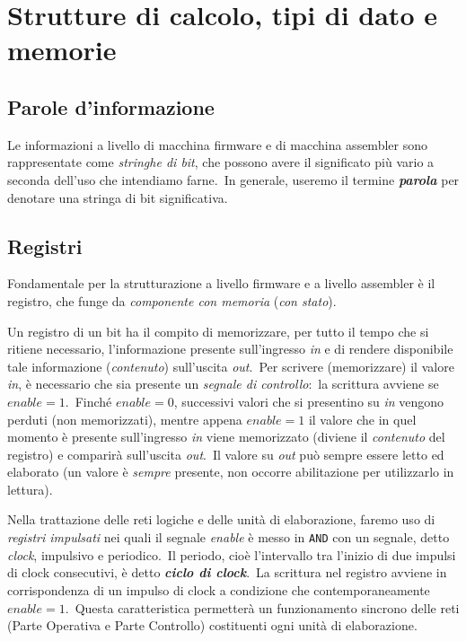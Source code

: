 \section{Strutture di calcolo, tipi di dato e memorie}

\subsection{Parole d'informazione}

Le informazioni a livello di macchina firmware e di macchina assembler sono rappresentate come \textit{stringhe di bit}, che possono avere il significato più vario a seconda dell'uso che intendiamo farne.\
In generale, useremo il termine \textbf{\textit{parola}} per denotare una stringa di bit significativa.

\subsection{Registri}

Fondamentale per la strutturazione a livello firmware e a livello assembler è il registro, che funge da \textit{componente con memoria} (\textit{con stato}).\

Un registro di un bit ha il compito di memorizzare, per tutto il tempo che si ritiene necessario, l'informazione presente sull'ingresso \textit{in} e di rendere disponibile tale informazione (\textit{contenuto}) sull'uscita \textit{out}.\
Per scrivere (memorizzare) il valore \textit{in}, è necessario che sia presente un \textit{segnale di controllo}:\ la scrittura avviene se $\mathit{enable} = 1$.\
Finché $\mathit{enable} = 0$, successivi valori che si presentino su \textit{in} vengono perduti (non memorizzati), mentre appena $\mathit{enable} = 1$ il valore che in quel momento è presente sull'ingresso \textit{in} viene memorizzato (diviene il \textit{contenuto} del registro) e comparirà sull'uscita \textit{out}.\
Il valore su \textit{out} può sempre essere letto ed elaborato (un valore è \textit{sempre} presente, non occorre abilitazione per utilizzarlo in lettura).

Nella trattazione delle reti logiche e delle unità di elaborazione, faremo uso di \textit{registri impulsati} nei quali il segnale \textit{enable} è messo in \texttt{AND} con un segnale, detto \textit{clock}, impulsivo e periodico.\
Il periodo, cioè l'intervallo tra l'inizio di due impulsi di clock consecutivi, è detto \textbf{\textit{ciclo di clock}}.\
La scrittura nel registro avviene in corrispondenza di un impulso di clock a condizione che contemporaneamente $\mathit{enable} = 1$.\
Questa caratteristica permetterà un funzionamento sincrono delle reti (Parte Operativa e Parte Controllo) costituenti ogni unità di elaborazione.

